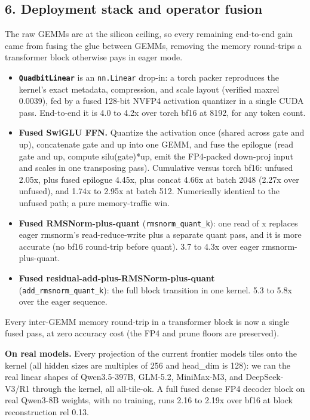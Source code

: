 \documentclass[
]{article}
\providecommand{\tightlist}{%
  \setlength{\itemsep}{0pt}\setlength{\parskip}{0pt}}
\begin{document}
\subsection{6. Deployment stack and operator
fusion}\label{deployment-stack-and-operator-fusion}

The raw GEMMs are at the silicon ceiling, so every remaining end-to-end
gain came from fusing the glue between GEMMs, removing the memory
round-trips a transformer block otherwise pays in eager mode.

\begin{itemize}
\tightlist
\item
  \textbf{\texttt{QuadbitLinear}} is an \texttt{nn.Linear} drop-in: a
  torch packer reproduces the kernel's exact metadata, compression, and
  scale layout (verified maxrel 0.0039), fed by a fused 128-bit NVFP4
  activation quantizer in a single CUDA pass. End-to-end it is 4.0 to
  4.2x over torch bf16 at 8192, for any token count.
\item
  \textbf{Fused SwiGLU FFN.} Quantize the activation once (shared across
  gate and up), concatenate gate and up into one GEMM, and fuse the
  epilogue (read gate and up, compute silu(gate)*up, emit the FP4-packed
  down-proj input and scales in one transposing pass). Cumulative versus
  torch bf16: unfused 2.05x, plus fused epilogue 4.45x, plus concat
  4.66x at batch 2048 (2.27x over unfused), and 1.74x to 2.95x at batch
  512. Numerically identical to the unfused path; a pure memory-traffic
  win.
\item
  \textbf{Fused RMSNorm-plus-quant} (\texttt{rmsnorm\_quant\_k}): one
  read of x replaces eager rmsnorm's read-reduce-write plus a separate
  quant pass, and it is more accurate (no bf16 round-trip before quant).
  3.7 to 4.3x over eager rmsnorm-plus-quant.
\item
  \textbf{Fused residual-add-plus-RMSNorm-plus-quant}
  (\texttt{add\_rmsnorm\_quant\_k}): the full block transition in one
  kernel. 5.3 to 5.8x over the eager sequence.
\end{itemize}

Every inter-GEMM memory round-trip in a transformer block is now a
single fused pass, at zero accuracy cost (the FP4 and prune floors are
preserved).

\textbf{On real models.} Every projection of the current frontier models
tiles onto the kernel (all hidden sizes are multiples of 256 and
head\_dim is 128): we ran the real linear shapes of Qwen3.5-397B,
GLM-5.2, MiniMax-M3, and DeepSeek-V3/R1 through the kernel, all
all-tile-ok. A full fused dense FP4 decoder block on real Qwen3-8B
weights, with no training, runs 2.16 to 2.19x over bf16 at block
reconstruction rel 0.13.
\end{document}

